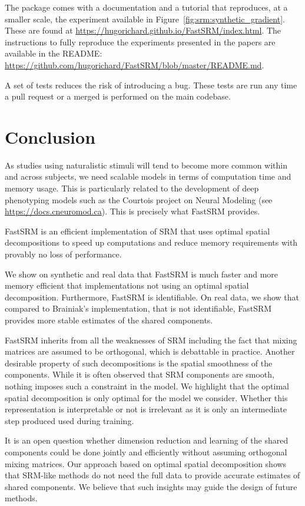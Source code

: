 \documentclass{article}
\begin{document}
The package comes with a documentation and a tutorial that reproduces, at a
smaller scale, the experiment available in Figure~\ref{fig:srm:synthetic_gradient}.
These are found at \url{https://hugorichard.github.io/FastSRM/index.html}.
The instructions to fully reproduce the experiments presented in the papers are
available in the README:
\url{https://github.com/hugorichard/FastSRM/blob/master/README.md}.

A set of tests reduces the risk of introducing a bug. These tests are run any
time a pull request or a merged is performed on the main codebase.

\section{Conclusion}
As studies using naturalistic stimuli will tend to become more common
within and across subjects, we need scalable models in terms of computation time
and memory usage.
%
This is particularly related to the development of deep phenotyping
models such as the Courtois project on Neural Modeling (see \url{https://docs.cneuromod.ca}).
%
This is precisely what FastSRM provides.

FastSRM is an efficient implementation of SRM
that uses optimal spatial decompositions to speed up computations and reduce memory requirements
with provably no loss of performance.

We show on synthetic and real data that FastSRM is much faster and more memory
efficient that implementations not using an optimal spatial decomposition.
Furthermore, FastSRM is identifiable. On real data, we show that compared to
Brainiak's implementation, that is not identifiable, FastSRM provides more
stable estimates of the shared components.

FastSRM inherits from all the weaknesses of SRM including the fact that
mixing matrices are assumed to be orthogonal, which is debattable in practice.
Another desirable property of such decompositions is the spatial smoothness of the components. While it is often observed that SRM components are smooth, nothing imposes such a constraint in the model. We highlight that the optimal spatial decomposition is only optimal for the model we consider. Whether this representation is interpretable or not is irrelevant as it is only an intermediate step produced used during training.

%
It is an open question whether dimension reduction and learning of the shared
components could be done jointly and efficiently without assuming orthogonal
mixing matrices.
%
Our approach based on optimal spatial decomposition shows that SRM-like methods do not need the
full data to provide accurate estimates of shared components. We believe that such
insights may guide the design of future methods.
\end{document}
